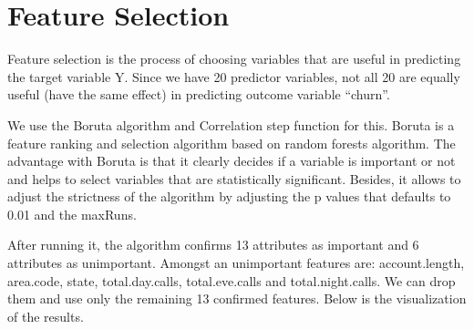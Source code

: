 \section{Feature Selection}\label{featureselection}

Feature selection is the process of choosing variables that are useful in predicting the target variable Y. Since we have 20 predictor variables, not all 20 are equally useful (have the same effect) in predicting outcome variable “churn”.

We use the Boruta algorithm and Correlation step function for this. Boruta is a feature ranking and selection algorithm based on random forests algorithm.
The advantage with Boruta is that it clearly decides if a variable is important or not and helps to select variables that are statistically significant. Besides, it allows to adjust the strictness of the algorithm by adjusting the p values that defaults to 0.01 and the maxRuns.

After running it, the algorithm confirms 13 attributes as important and 6 attributes as unimportant. Amongst an unimportant features are: account.length, area.code, state,
total.day.calls, total.eve.calls and total.night.calls. We can drop them and use only the remaining 13 confirmed features. Below is the visualization of the results.


